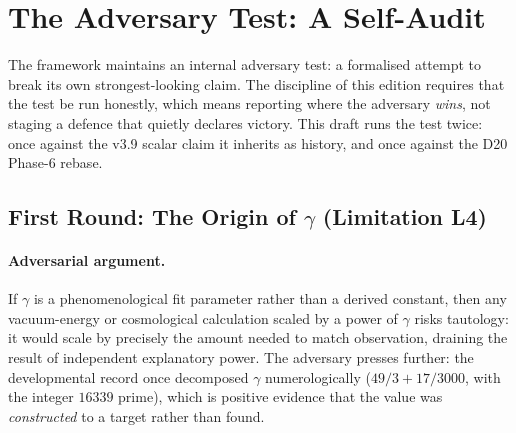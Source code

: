\documentclass[12pt,a4paper,twoside]{article}
\theoremstyle{plain}
\theoremstyle{definition}
\theoremstyle{remark}
\begin{document}
\section{The Adversary Test: A Self-Audit}
\label{sec:adversary}

\noindent The framework maintains an internal adversary test: a
formalised attempt to break its own strongest-looking claim. The
discipline of this edition requires that the test be run honestly, which
means reporting where the adversary \emph{wins}, not staging a defence
that quietly declares victory. This draft runs the test twice: once against the v3.9 scalar claim it
inherits as history, and once against the D20 Phase-6 rebase.

\subsection{First Round: The Origin of \texorpdfstring{$\gamma$}{gamma} (Limitation L4)}
\label{subsec:adversary-gamma}

\paragraph{Adversarial argument.}
If $\gamma$ is a phenomenological fit parameter rather than a derived
constant, then any vacuum-energy or cosmological calculation scaled by a
power of $\gamma$ risks tautology: it would scale by precisely the amount
needed to match observation, draining the result of independent
explanatory power. The adversary presses further: the developmental
record once decomposed $\gamma$ numerologically ($49/3 + 17/3000$, with
the integer $16339$ prime), which is positive evidence that the value was
\emph{constructed} to a target rather than found.
\end{document}
